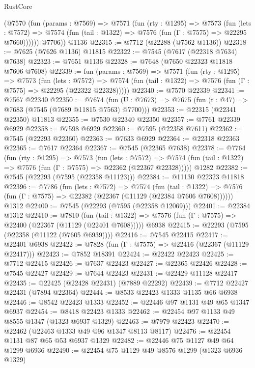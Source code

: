 \begin{lexlean}{RustCore}
\begin{coremodule}
        (@7570
          (fun (params : @7569) =>
          @7571
            (fun (rty : @1295) =>
            @7573
              (fun (lets : @7572) =>
              @7574 (fun (tail : @1322) => @7576 (fun (Γ : @7575) => @22295 @7660))))))
        @7706))
    @1136
@22315 := @7712 (@22288 (@7562 @1136))
@22318 := @7625 (@7626 @1136) @11815
@22322 := @7545 (@7617 (@22318 @7634) @7638)
@22323 := @7651 @1136
@22328 := @7648 (@7650 @22323 @11818 @7606 @7608)
@22339 := fun (params : @7569) =>
  @7571
    (fun (rty : @1295) =>
    @7573
      (fun (lets : @7572) =>
      @7574 (fun (tail : @1322) => @7576 (fun (Γ : @7575) => @22295 (@22322 @22328)))))
@22340 := @7570 @22339
@22341 := @7567 @22340
@22350 := @7674
    (fun (U : @7673) => @7675 (fun (t : @47) => @7683 (@7545 (@7689 @11815 @7563) @7700)))
@22353 := @22315 (@22341 @22350) @11813
@22355 := @7530 @22340 @22350
@22357 := @7761 @22339 @6929
@22358 := @7598 @6929
@22360 := @7595 (@22358 @7611)
@22362 := @7545 (@22293 @22360)
@22363 := @7633 @6929
@22364 := @22318 @22363
@22365 := @7617 @22364
@22367 := @7545 (@22365 @7638)
@22378 := @7764
    (fun (rty : @1295) =>
    @7573
      (fun (lets : @7572) =>
      @7574 (fun (tail : @1322) => @7576 (fun (Γ : @7575) => @22362 (@22367 @22328)))))
    @1282
@22382 := @7545 (@22293 (@7595 (@22358 @11123)))
@22384 := @11130 @22323 @11818
@22396 := @7786
    (fun (lets : @7572) =>
    @7574
      (fun (tail : @1322) =>
      @7576 (fun (Γ : @7575) => @22382 (@22367 (@11129 (@22384 @7606 @7608))))))
    @1312
@22400 := @7545 (@22293 (@7595 (@22358 @12069)))
@22401 := @22384 @1312
@22410 := @7810
    (fun (tail : @1322) => @7576 (fun (Γ : @7575) => @22400 (@22367 (@11129 (@22401 @7608)))))
    @6938
@22415 := @22293 (@7595 (@22358 (@11122 (@7605 @6939))))
@22416 := @7545 @22415
@22417 := @22401 @6938
@22422 := @7828 (fun (Γ : @7575) => @22416 (@22367 (@11129 @22417)))
@22423 := @7852 @18391
@22424 := @22422 @22423
@22425 := @7712 @22415
@22426 := @7637 @22423
@22427 := @22365 @22426
@22428 := @7545 @22427
@22429 := @7644 @22423
@22431 := @22429 @11128 @22417
@22435 := @22425 (@22428 @22431) (@7889 @22292)
@22439 := @7712 @22427 @22431 (@7894 @22364)
@22444 := @8533 @22423 @1333 @1135 @66 @6938
@22446 := @8542 @22423 @1333
@22452 := @22446 @97 @1131 @49 @65 @1347 @6937
@22454 := @8418 @22423 @1333
@22462 := @22454 @97 @1133 @49 @8555 @1347 (@1323 @6937 @1329)
@22463 := @7979 @22423
@22470 := @22462 (@22463 @1333 @49 @96 @1347 @8113 @8117)
@22476 := @22454 @1131 @87 @65 @53 @6937 @1329
@22482 := @22446 @75 @1127 @49 @64 @1299 @6936
@22490 := @22454 @75 @1129 @49 @8576 @1299 (@1323 @6936 @1329)

\end{coremodule}
\end{lexlean}
